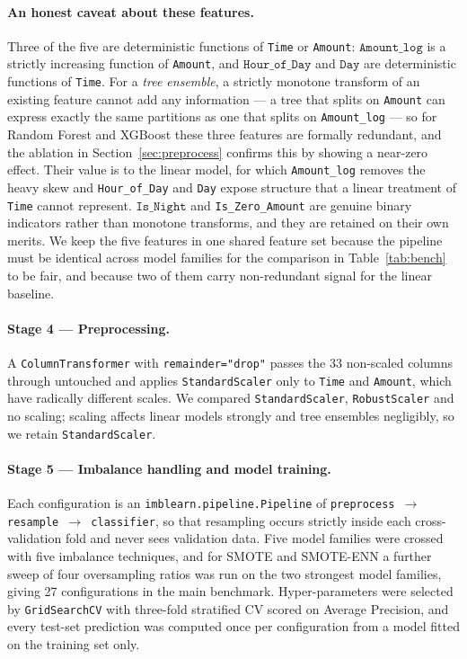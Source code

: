 \paragraph{An honest caveat about these features.} Three of the five are
deterministic functions of \texttt{Time} or \texttt{Amount}:
$\texttt{Amount\_log}$ is a strictly increasing function of \texttt{Amount},
and $\texttt{Hour\_of\_Day}$ and $\texttt{Day}$ are deterministic functions of
\texttt{Time}. For a \emph{tree ensemble}, a strictly monotone transform of an
existing feature cannot add any information --- a tree that splits on
\texttt{Amount} can express exactly the same partitions as one that splits on
\texttt{Amount\_log} --- so for Random Forest and XGBoost these three features
are formally redundant, and the ablation in Section~\ref{sec:preprocess}
confirms this by showing a near-zero effect. Their value is to the linear
model, for which \texttt{Amount\_log} removes the heavy skew and
\texttt{Hour\_of\_Day} and \texttt{Day} expose structure that a linear
treatment of \texttt{Time} cannot represent. $\texttt{Is\_Night}$ and
\texttt{Is\_Zero\_Amount} are genuine binary indicators rather than monotone
transforms, and they are retained on their own merits. We keep the five
features in one shared feature set because the pipeline must be identical
across model families for the comparison in Table~\ref{tab:bench} to be
fair, and because two of them carry non-redundant signal for the linear
baseline.

\paragraph*{Stage 4 --- Preprocessing.}
A \texttt{ColumnTransformer} with \texttt{remainder="drop"} passes the 33
non-scaled columns through untouched and applies \texttt{StandardScaler} only
to \texttt{Time} and \texttt{Amount}, which have radically different scales.
We compared \texttt{StandardScaler}, \texttt{RobustScaler} and no scaling;
scaling affects linear models strongly and tree ensembles negligibly, so we
retain \texttt{StandardScaler}.

\paragraph*{Stage 5 --- Imbalance handling and model training.}
Each configuration is an \texttt{imblearn.pipeline.Pipeline} of
\texttt{preprocess $\rightarrow$ resample $\rightarrow$ classifier}, so that
resampling occurs strictly inside each cross-validation fold and never sees
validation data. Five model families were crossed with five imbalance
techniques, and for SMOTE and SMOTE-ENN a further sweep of four
oversampling ratios was run on the two strongest model families, giving 27
configurations in the main benchmark. Hyper-parameters were selected by
\texttt{GridSearchCV} with three-fold stratified CV scored on Average
Precision, and every test-set prediction was computed once per configuration
from a model fitted on the training set only.

